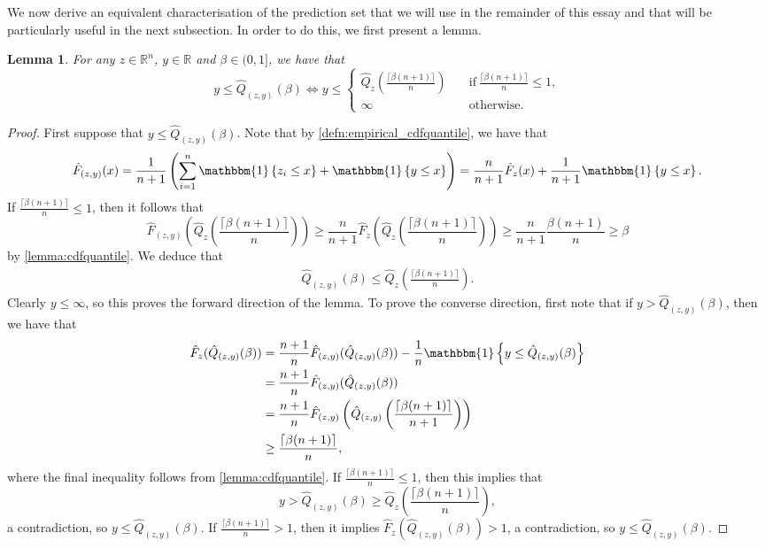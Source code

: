 \documentclass[11pt, titlepage]{article} %
\newcommand{\R}{\mathrm}
\newcommand{\Ind}[1]{\mathbbm{1}\left\{ #1 \right\}}
\numberwithin{equation}{section}
\newtheorem{lemma}{Lemma}
\theoremstyle{definition}
\numberwithin{theorem}{section}
\numberwithin{lemma}{section}
\numberwithin{corollary}{section}
\numberwithin{proposition}{section}
\numberwithin{definition}{section}
\numberwithin{remark}{section}
\begin{document}
\noindent
We now derive an equivalent characterisation of the prediction set that we will use in the remainder of this essay and that will be particularly useful in the next subsection. In order to do this, we first present a lemma.

\begin{lemma}
    For any \(z \in \mathbb{R}^n\), \(y \in \mathbb{R}\) and \(\beta \in (0,1]\), we have that \[y \leq \hat{Q}_{(z,y)} (\beta) \iff y \leq \begin{cases}
        \hat{Q}_z\left( \frac{\lceil \beta (n+1) \rceil }{n} \right) \quad &\R{if} \ \frac{\lceil \beta(n+1) \rceil}{n} \leq 1, \\
        \infty \quad &\R{otherwise}.
    \end{cases} \]
\label{lemma:quantile_lemma}
\end{lemma}

\begin{proof}
    First suppose that \(y \leq \hat{Q}_{(z,y)}(\beta)\). Note that by \cref{defn:empirical_cdfquantile}, we have that \[\hat{F}_{(z,y)} (x) = \frac{1}{n+1} \left( \sum_{i=1}^n \Ind{z_i \leq x} + \Ind{y \leq x} \right) = \frac{n}{n+1} \hat{F}_z(x) + \frac{1}{n+1}\Ind{y \leq x}.\] If \( \frac{\lceil \beta (n+1) \rceil}{n} \leq 1\), then it follows that \[\hat{F}_{(z,y)}\left(  \hat{Q}_z \left( \frac{\lceil \beta (n+1) \rceil }{n} \right) \right) \geq \frac{n}{n+1} \hat{F}_z \left( \hat{Q}_z \left( \frac{\lceil \beta (n+1) \rceil }{n} \right) \right) \geq \frac{n}{n+1} \frac{\beta(n+1)}{n} \geq \beta \] by \cref{lemma:cdfquantile}. We deduce that \begin{align}
        \hat{Q}_{(z,y)}(\beta) \leq \hat{Q}_z \left( \frac{\lceil \beta (n+1) \rceil }{n} \right).
    \label{eqn:quantile_lemma_disp1}
    \end{align} Clearly \(y \leq \infty\), so this proves the forward direction of the lemma. To prove the converse direction, first note that if \(y > \hat{Q}_{(z,y)}(\beta)\), then we have that \begin{align}
        \hat{F}_z(\hat{Q}_{(z,y)}(\beta)) &= \frac{n+1}{n} \hat{F}_{(z,y)}(\hat{Q}_{(z,y)}(\beta)) - \frac{1}{n} \Ind{y \leq \hat{Q}_{(z,y)}(\beta)} \label{eqn:quantile_lemma_disp2}\\
        &= \frac{n+1}{n} \hat{F}_{(z,y)} (\hat{Q}_{(z,y)} (\beta) ) \nonumber\\
        &= \frac{n+1}{n} \hat{F}_{(z,y)} \left(  \hat{Q}_{(z,y)} \left( \frac{\lceil \beta (n+1) \rceil }{n+1} \right) \right) \nonumber\\
        &\geq \frac{\lceil \beta (n+1) \rceil }{n} \nonumber, 
    \end{align} where the final inequality follows from \cref{lemma:cdfquantile}. If \(\frac{\lceil \beta (n+1) \rceil}{n} \leq 1\), then this implies that \[y > \hat{Q}_{(z,y)}(\beta) \geq \hat{Q}_z \left( \frac{\lceil \beta (n+1) \rceil}{n} \right), \] a contradiction, so \(y \leq \hat{Q}_{(z,y)}(\beta)\). If \(\frac{\lceil\beta  (n+1) \rceil}{n} > 1\), then it implies \(\hat{F}_z(\hat{Q}_{(z,y)}(\beta)) > 1\), a contradiction, so \(y \leq \hat{Q}_{(z,y)}(\beta).\)
\end{proof}
\end{document}
